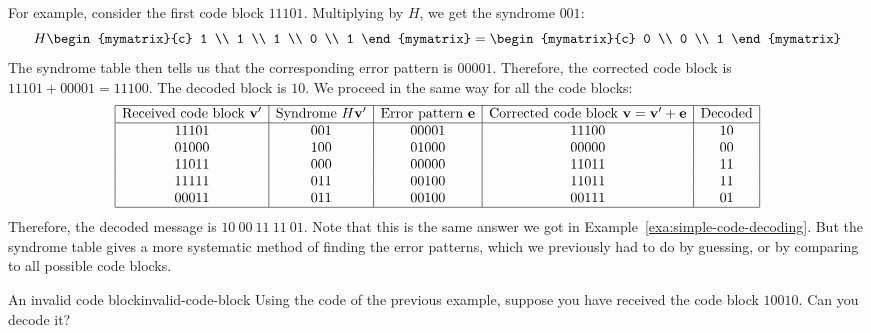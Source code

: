 \begin{solution}
  For example, consider the first code block $11101$. Multiplying by
  $H$, we get the syndrome $001$:
  \begin{equation*}
    H \begin{mymatrix}{c} 1 \\ 1 \\ 1 \\ 0 \\ 1 \end{mymatrix}
    = \begin{mymatrix}{c} 0 \\ 0 \\ 1 \end{mymatrix}
  \end{equation*}
  The syndrome table then tells us that the corresponding error pattern
  is $00001$. Therefore, the corrected code block is $11101 + 00001 =
  11100$. The decoded block is $10$. We proceed in the same way for
  all the code blocks:
  \begin{equation*}
    \begin{array}{|c|c|c|c|c|}
      \hline
      \mbox{Received code block $\vect{v}'$} &
      \mbox{Syndrome $H\vect{v}'$} &
      \mbox{Error pattern $\vect{e}$} &
      \mbox{Corrected code block $\vect{v}=\vect{v}'+\vect{e}$} &
      \mbox{Decoded} \\
      \hline
      11101 & 001 & 00001 & 11100 & 10 \\
      01000 & 100 & 01000 & 00000 & 00 \\
      11011 & 000 & 00000 & 11011 & 11 \\
      11111 & 011 & 00100 & 11011 & 11 \\
      00011 & 011 & 00100 & 00111 & 01 \\
      \hline
    \end{array}
  \end{equation*}
  Therefore, the decoded message is $10~00~11~11~01$. Note that this
  is the same answer we got in Example~\ref{exa:simple-code-decoding}.
  But the syndrome table gives a more systematic method of finding the
  error patterns, which we previously had to do by guessing, or by
  comparing to all possible code blocks.
\end{solution}

\begin{example}{An invalid code block}{invalid-code-block}
  Using the code of the previous example, suppose you have received
  the code block $10010$. Can you decode it?  
\end{example}

